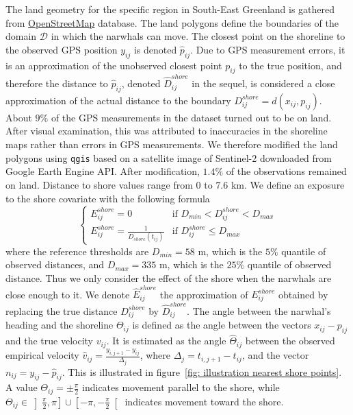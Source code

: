 \documentclass[11pt]{article}
\newcommand {\1}{\mathbb{1}}
\begin{document}
The land geometry for the specific region in South-East Greenland is gathered from \href{https://www.openstreetmap.org/#map=11/70.4029/-27.2928}{OpenStreetMap} database. The land polygons define the boundaries of the domain $\mathcal{D}$ in which the narwhals can move. The closest point on the shoreline to the observed GPS position $y_{ij}$  is denoted $\hat{p}_{ij}$. Due to GPS measurement errors, it is an approximation of the unobserved closest point $p_{ij}$ to the true position, and therefore the distance to $\hat{p}_{ij}$, denoted $\hat{D}^{shore}_{ij}$ in the sequel, is considered a close approximation of the actual distance to the boundary $D^{shore}_{ij}=d(x_{ij},p_{ij})$. About $9\%$ of the GPS measurements in the dataset turned out to be on land. After visual examination, this was attributed to inaccuracies in the shoreline maps rather than errors in GPS measurements. We therefore modified the land polygons using \texttt{qgis} based on a satellite image of Sentinel-2 downloaded from Google Earth Engine API. After modification,  $1.4 \%$ of the observations remained on land. Distance to shore values range from $0$ to $7.6$ km. We define an exposure to the shore covariate with the following formula
\begin{equation}
	\left\{
	\begin{array}{ll}
		E^{shore}_{ij}=0 & \mbox{if } D_{min} <D^{shore}_{ij}<D_{max} \\
		E^{shore}_{ij}=\frac{1}{D_{shore}(t_{ij})} & \mbox{if } D^{shore}_{ij} \leq D_{max}
	\end{array}
	\right.
	\label{eq: exp shore definition}
\end{equation}
where the reference thresholds are $D_{min}=58$ m, which is the $5\%$ quantile of observed distances, and $D_{max}=335$ m, which is the $25 \%$ quantile of observed distance. Thus we only consider the effect of the shore when the narwhals are close enough to it. We denote $\hat{E}^{shore}_{ij}$ the approximation of $E^{shore}_{ij}$ obtained by replacing the true distance $D^{shore}_{ij}$ by $\hat{D}^{shore}_{ij}$.
The angle between the narwhal's heading and the shoreline $\Theta_{ij}$ is defined as the angle between the vectors $x_{ij}-p_{ij}$ and the true velocity $v_{ij}$. It is estimated as the angle $\hat{\Theta}_{ij}$ between the observed empirical velocity $\hat{v}_{ij}=\frac{y_{i,j+1}-y_{ij}}{\Delta_j}$, where $\Delta_j=t_{i,j+1}-t_{ij}$, and the vector $n_{ij}=y_{ij}-\hat{p}_{ij}$. This is illustrated in figure~\ref{fig: illustration nearest shore points}. A value $\Theta_{ij}=\pm \frac{\pi}{2}$ indicates movement parallel to the shore, while $\Theta_{ij} \in \left]\frac{\pi}{2},\pi\right] \cup \left[-\pi,-\frac{\pi}{2}\right[$ indicates movement toward the shore. 
\end{document}
